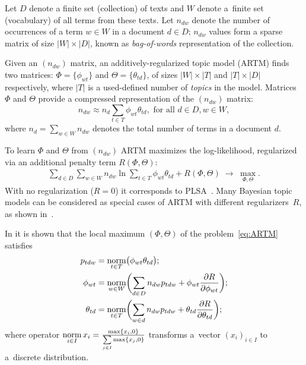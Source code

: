 \documentclass[russian,english]{llncs}
\newcommand{\norm}{\mathop{\rm norm}\limits}
\begin{document}
Let
$D$ denote a finite set (collection) of texts and
$W$ denote a~finite set (vocabulary) of all terms from these texts.
Let
$n_{dw}$ denote the number of occurrences of a term $w \in W$ in a document $d \in D$;
$n_{dw}$ values form a sparse matrix of size $|W| \times |D|$,
known as \emph{bag-of-words} representation of the collection.

Given an $(n_{dw})$ matrix, an additively-regularized topic model (ARTM) finds two matrices:
$\Phi = \{\phi_{wt}\}$ and $\Theta = \{\theta_{td}\}$,
of sizes $|W| \times |T|$ and $|T| \times |D|$ respectively,
where $|T|$ is a used-defined number of \emph{topics} in the model.
Matrices $\Phi$ and $\Theta$
provide a compressed representation of the $(n_{dw})$ matrix:
\[
n_{dw} \approx n_d \sum_{t \in T} \phi_{wt} \theta_{td}, \text { for all } d \in D, w \in W,
\]
where $n_d = \sum_{w \in W} n_{dw}$ denotes the total number of terms in a document $d$.

To learn $\Phi$ and $\Theta$ from $(n_{dw})$ ARTM maximizes
the log-likelihood, regularized via an additional penalty term $R(\Phi, \Theta)$:
\begin{gather}
\label{eq:ARTM}
    \sum_{d\in D}\sum_{w\in W} n_{dw} \ln \sum_{t\in T} \phi_{wt} \theta_{td} + R(\Phi, \Theta)
    \;\to\; \max_{\Phi,\Theta}.
\end{gather}
With no regularization (${R=0}$) it corresponds to PLSA~\cite{hofmann99plsi}.
Many Bayesian topic models can be considered
as special cases of ARTM with different regularizers~$R$,
as shown in~\cite{voron14mlj,voron14aist}.

In \cite{voron14dan-eng} it is shown that the \mbox{local} maximum $(\Phi,\Theta)$
of the problem~\eqref{eq:ARTM} satisfies
\begin{align}
    \label{eq:Estep}
    p_{tdw} &= \norm_{t\in T} \bigl(\phi_{wt}\theta_{td}\bigr);
\\
    \label{eq:Mstep:phi}
    \phi_{wt} &= \norm_{w\in W}
        \biggl(
            \sum_{d\in D} n_{dw} p_{tdw} + \phi_{wt} \frac{\partial R}{\partial \phi_{wt}}
        \biggr);
\\
    \label{eq:Mstep:theta}
    \theta_{td} &= \norm_{t\in T}
        \biggl(
            \sum_{w\in d} n_{dw} p_{tdw} + \theta_{td} \frac{\partial R}{\partial \theta_{td}}
        \biggr);
\end{align}
where operator
$\norm_{i \in I} x_i = \frac{\max\{x_i,0\}}{\sum\limits_{j\in I} \max\{x_j,0\}}$
transforms a~vector $(x_i)_{i \in I}$ to a~discrete distribution.
\end{document}
